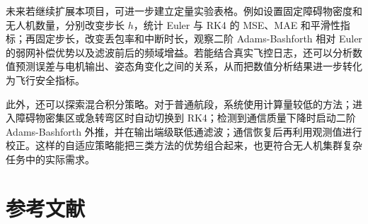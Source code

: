 \documentclass[UTF8,zihao=-4]{ctexart}
\begin{document}
未来若继续扩展本项目，可进一步建立定量实验表格。例如设置固定障碍物密度和无人机数量，分别改变步长 $h$，统计 Euler 与 RK4 的 MSE、MAE 和平滑性指标；再固定步长，改变丢包率和中断时长，观察二阶 Adams-Bashforth 相对 Euler 的弱网补偿优势以及滤波前后的频域增益。若能结合真实飞控日志，还可以分析数值预测误差与电机输出、姿态角变化之间的关系，从而把数值分析结果进一步转化为飞行安全指标。

此外，还可以探索混合积分策略。对于普通航段，系统使用计算量较低的方法；进入障碍物密集区或急转弯区时自动切换到 RK4；检测到通信质量下降时启动二阶 Adams-Bashforth 外推，并在输出端级联低通滤波；通信恢复后再利用观测值进行校正。这样的自适应策略能把三类方法的优势组合起来，也更符合无人机集群复杂任务中的实际需求。

\section*{参考文献}
\end{document}
